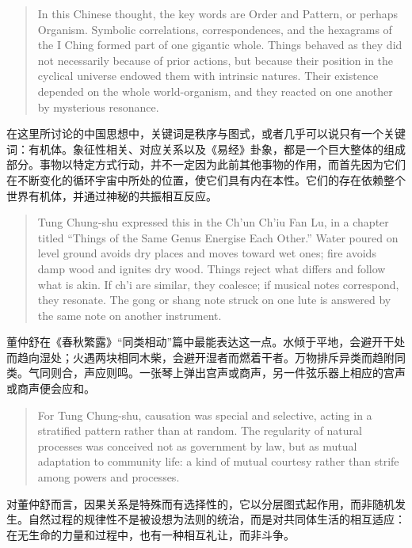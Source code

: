 \documentclass[UTF8,zihao=-4]{ctexart}
\newenvironment{enblock}
  {\par\smallskip\noindent{\scriptsize\bfseries English}\par\begin{quote}\small}
  {\end{quote}}
\newenvironment{zhblock}
  {\par\noindent{\scriptsize\bfseries 中文}\par}
  {\par\medskip}
\begin{document}
\begin{enblock}
In this Chinese thought, the key words are Order and Pattern, or perhaps Organism. Symbolic correlations, correspondences, and the hexagrams of the I Ching formed part of one gigantic whole. Things behaved as they did not necessarily because of prior actions, but because their position in the cyclical universe endowed them with intrinsic natures. Their existence depended on the whole world-organism, and they reacted on one another by mysterious resonance.
\end{enblock}
\begin{zhblock}
在这里所讨论的中国思想中，关键词是秩序与图式，或者几乎可以说只有一个关键词：有机体。象征性相关、对应关系以及《易经》卦象，都是一个巨大整体的组成部分。事物以特定方式行动，并不一定因为此前其他事物的作用，而首先因为它们在不断变化的循环宇宙中所处的位置，使它们具有内在本性。它们的存在依赖整个世界有机体，并通过神秘的共振相互反应。
\end{zhblock}

\begin{enblock}
Tung Chung-shu expressed this in the Ch'un Ch'iu Fan Lu, in a chapter titled ``Things of the Same Genus Energise Each Other.'' Water poured on level ground avoids dry places and moves toward wet ones; fire avoids damp wood and ignites dry wood. Things reject what differs and follow what is akin. If ch'i are similar, they coalesce; if musical notes correspond, they resonate. The gong or shang note struck on one lute is answered by the same note on another instrument.
\end{enblock}
\begin{zhblock}
董仲舒在《春秋繁露》“同类相动”篇中最能表达这一点。水倾于平地，会避开干处而趋向湿处；火遇两块相同木柴，会避开湿者而燃着干者。万物排斥异类而趋附同类。气同则合，声应则鸣。一张琴上弹出宫声或商声，另一件弦乐器上相应的宫声或商声便会应和。
\end{zhblock}

\begin{enblock}
For Tung Chung-shu, causation was special and selective, acting in a stratified pattern rather than at random. The regularity of natural processes was conceived not as government by law, but as mutual adaptation to community life: a kind of mutual courtesy rather than strife among powers and processes.
\end{enblock}
\begin{zhblock}
对董仲舒而言，因果关系是特殊而有选择性的，它以分层图式起作用，而非随机发生。自然过程的规律性不是被设想为法则的统治，而是对共同体生活的相互适应：在无生命的力量和过程中，也有一种相互礼让，而非斗争。
\end{zhblock}
\end{document}
